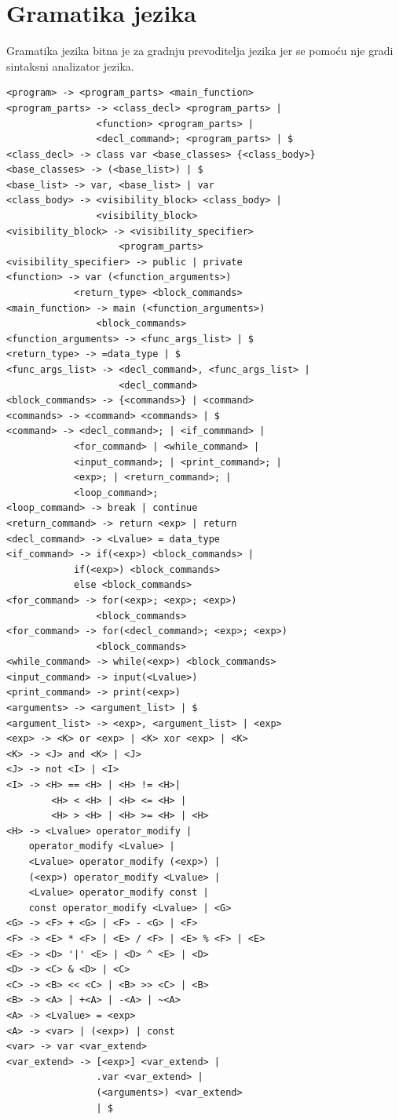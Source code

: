 \documentclass[times, utf8, zavrsni]{fer}
\begin{document}
\section{Gramatika jezika} \label{gramatika}
Gramatika jezika bitna je za gradnju prevoditelja jezika jer se pomoću nje gradi sintaksni analizator jezika.

\begin{verbatim}
<program> -> <program_parts> <main_function>
<program_parts> -> <class_decl> <program_parts> |
                <function> <program_parts> | 
                <decl_command>; <program_parts> | $
<class_decl> -> class var <base_classes> {<class_body>}
<base_classes> -> (<base_list>) | $
<base_list> -> var, <base_list> | var
<class_body> -> <visibility_block> <class_body> | 
                <visibility_block>
<visibility_block> -> <visibility_specifier> 
                    <program_parts>
<visibility_specifier> -> public | private
<function> -> var (<function_arguments>) 
            <return_type> <block_commands>
<main_function> -> main (<function_arguments>) 
                <block_commands>
<function_arguments> -> <func_args_list> | $
<return_type> -> =data_type | $
<func_args_list> -> <decl_command>, <func_args_list> |
                    <decl_command>
<block_commands> -> {<commands>} | <command>
<commands> -> <command> <commands> | $
<command> -> <decl_command>; | <if_commmand> | 
            <for_command> | <while_command> | 
            <input_command>; | <print_command>; |
            <exp>; | <return_command>; | 
            <loop_command>;
<loop_command> -> break | continue
<return_command> -> return <exp> | return
<decl_command> -> <Lvalue> = data_type
<if_command> -> if(<exp>) <block_commands> | 
            if(<exp>) <block_commands> 
            else <block_commands>
<for_command> -> for(<exp>; <exp>; <exp>)
                <block_commands>
<for_command> -> for(<decl_command>; <exp>; <exp>) 
                <block_commands>
<while_command> -> while(<exp>) <block_commands>
<input_command> -> input(<Lvalue>)
<print_command> -> print(<exp>)
<arguments> -> <argument_list> | $
<argument_list> -> <exp>, <argument_list> | <exp>
<exp> -> <K> or <exp> | <K> xor <exp> | <K>
<K> -> <J> and <K> | <J>
<J> -> not <I> | <I>
<I> -> <H> == <H> | <H> != <H>| 
        <H> < <H> | <H> <= <H> |
        <H> > <H> | <H> >= <H> | <H>
<H> -> <Lvalue> operator_modify | 
    operator_modify <Lvalue> |
    <Lvalue> operator_modify (<exp>) |
    (<exp>) operator_modify <Lvalue> |
    <Lvalue> operator_modify const | 
    const operator_modify <Lvalue> | <G>
<G> -> <F> + <G> | <F> - <G> | <F>
<F> -> <E> * <F> | <E> / <F> | <E> % <F> | <E>
<E> -> <D> '|' <E> | <D> ^ <E> | <D>
<D> -> <C> & <D> | <C>
<C> -> <B> << <C> | <B> >> <C> | <B>
<B> -> <A> | +<A> | -<A> | ~<A>
<A> -> <Lvalue> = <exp>
<A> -> <var> | (<exp>) | const
<var> -> var <var_extend>
<var_extend> -> [<exp>] <var_extend> | 
                .var <var_extend> |
                (<arguments>) <var_extend>
                | $
\end{verbatim}
\end{document}
